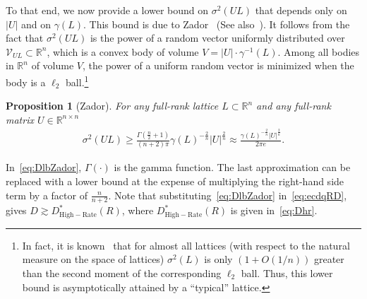 \documentclass[journal]{IEEEtran}
\newcommand{\ZZ}{\mathbb{Z}}
\newcommand{\RR}{\mathbb{R}}
\newcommand{\Vol}{\mathrm{Vol}}
\newcommand{\m}{\mathcal}
\newcommand{\reff}{r_\mathrm{eff}}
\newcommand{\HR}{\mathrm{High-Rate}}
\newcommand{\covol}{\mathrm{covol}}
\newtheorem{proposition}{Proposition}
\begin{document}


To that end, we now provide a lower bound on $\sigma^2(UL)$ that depends only on $|U|$ and on $\gamma(L)$. This bound is due to Zador~\cite{zador1982asymptotic} (See also~\cite[eq. (82)]{ConwaySloane}). It follows from the fact that $\sigma^2(UL)$ is the power of a random vector uniformly distributed over $\m{V}_{UL}\subset\RR^n$, which is a convex body of volume $V=|U|\cdot\gamma^{-1}(L)$. Among all bodies in $\RR^n$ of volume $V$, the power of a uniform random vector is minimized when the body is a $\ell_2$ ball.\footnote{In fact, it is known~\cite{ordentlich2025voronoi} that for almost all lattices (with respect to the natural measure on the space of lattices) $\sigma^2(L)$ is  only $(1+O(1/n))$ greater than the second moment of the corresponding $\ell_2$ ball. Thus, this lower bound is asymptotically attained by a ``typical'' lattice.}

\begin{proposition}[Zador]
For any full-rank lattice $L\subset\RR^n$ and any full-rank matrix $U\in\RR^{n\times n}$
\begin{align}
\sigma^2(UL)\geq \frac{\Gamma\left(\frac{n}{2}+1\right)}{(n+2)\pi}\gamma(L)^{-\frac{2}{n}}|U|^{\frac{2}{n}}\approx\frac{\gamma(L)^{-\frac{2}{n}}|U|^{\frac{2}{n}}}{2\pi e}.
\label{eq:DlbZador}
\end{align}
\label{lem:DlbZador}
\end{proposition}
In~\eqref{eq:DlbZador}, $\Gamma(\cdot)$ is the gamma function. The last approximation can be replaced with a lower bound at the expense of multiplying the right-hand side term by a factor of $\frac{n}{n+2}$. Note that substituting~\eqref{eq:DlbZador} in~\eqref{eq:ecdqRD}, gives $D\gtrsim D_{\HR}^*(R)$, where $D_{\HR}^*(R)$ is given in~\eqref{eq:Dhr}. 
\end{document}
